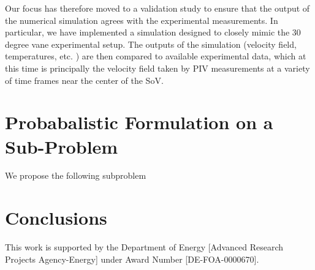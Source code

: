\documentclass{article}
\begin{document}
Our focus has therefore moved to a validation study to ensure that the
output of the  numerical simulation agrees with the experimental
measurements. In particular, we have implemented a simulation designed
to closely mimic the 30 degree vane experimental setup. The outputs of
the simulation (velocity field, temperatures, etc. ) are then compared
to available experimental data, which at this time is principally the
velocity field taken by PIV measurements at a variety of time frames
near the center of the SoV. 


%
%
%
%
\section{Probabalistic Formulation on a Sub-Problem}


We propose the following subproblem

%
%
%
\section{Conclusions}




%
%
\newpage
This work is supported by the Department of Energy [Advanced Research
Projects Agency-Energy] under Award Number [DE-FOA-0000670].   
\end{document}
